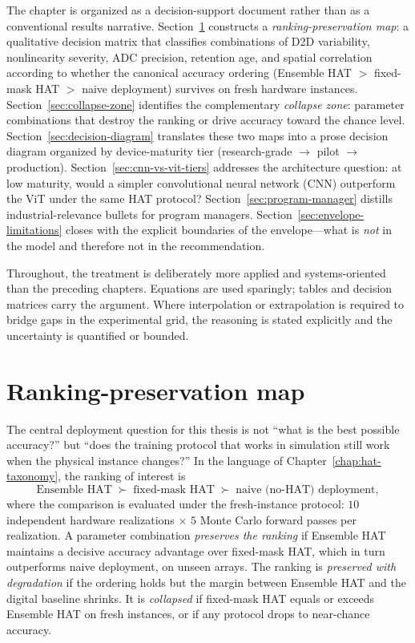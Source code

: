 The chapter is organized as a decision-support document rather than as a conventional results narrative.  Section~\ref{sec:ranking-preservation} constructs a \emph{ranking-preservation map}: a qualitative decision matrix that classifies combinations of D2D variability, nonlinearity severity, ADC precision, retention age, and spatial correlation according to whether the canonical accuracy ordering (Ensemble HAT $>$ fixed-mask HAT $>$ naive deployment) survives on fresh hardware instances.  Section~\ref{sec:collapse-zone} identifies the complementary \emph{collapse zone}: parameter combinations that destroy the ranking or drive accuracy toward the chance level.  Section~\ref{sec:decision-diagram} translates these two maps into a prose decision diagram organized by device-maturity tier (research-grade $\rightarrow$ pilot $\rightarrow$ production).  Section~\ref{sec:cnn-vs-vit-tiers} addresses the architecture question: at low maturity, would a simpler convolutional neural network (CNN) outperform the ViT under the same HAT protocol?  Section~\ref{sec:program-manager} distills industrial-relevance bullets for program managers.  Section~\ref{sec:envelope-limitations} closes with the explicit boundaries of the envelope---what is \emph{not} in the model and therefore not in the recommendation.

Throughout, the treatment is deliberately more applied and systems-oriented than the preceding chapters.  Equations are used sparingly; tables and decision matrices carry the argument.  Where interpolation or extrapolation is required to bridge gaps in the experimental grid, the reasoning is stated explicitly and the uncertainty is quantified or bounded.


\section{Ranking-preservation map}
\label{sec:ranking-preservation}

The central deployment question for this thesis is not ``what is the best possible accuracy?'' but ``does the training protocol that works in simulation still work when the physical instance changes?''  In the language of Chapter~\ref{chap:hat-taxonomy}, the ranking of interest is
\begin{equation}
    \text{Ensemble HAT} \;\succ\; \text{fixed-mask HAT} \;\succ\; \text{naive (no-HAT) deployment},
    \label{eq:ranking}
\end{equation}
where the comparison is evaluated under the fresh-instance protocol: $10$ independent hardware realizations $\times$ $5$ Monte Carlo forward passes per realization.  A parameter combination \emph{preserves the ranking} if Ensemble HAT maintains a decisive accuracy advantage over fixed-mask HAT, which in turn outperforms naive deployment, on unseen arrays.  The ranking is \emph{preserved with degradation} if the ordering holds but the margin between Ensemble HAT and the digital baseline shrinks.  It is \emph{collapsed} if fixed-mask HAT equals or exceeds Ensemble HAT on fresh instances, or if any protocol drops to near-chance accuracy.

